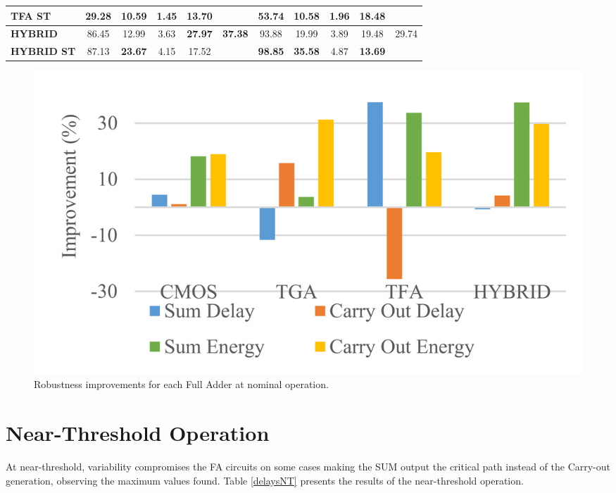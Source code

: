 \documentclass[ecp,tc, english]{iiufrgs}
\begin{document}
\begin{table}[H]
{\begin{tabular}{|l|c|c|c|c|c|c|c|c|c|c|}
\textbf{TFA ST}                   & 29.28          & 10.59          & 1.45          & \textbf{13.70} &                                 & 53.74          & 10.58          & 1.96          & 18.48          &                                 \\ \hline
\textbf{HYBRID}                   & 86.45          & 12.99          & 3.63          & \textbf{27.97} & \multirow{2}{*}{\textbf{37.38}} & 93.88          & 19.99          & 3.89          & 19.48          & \multirow{2}{*}{29.74}          \\ \cline{1-5} \cline{7-10}
\textbf{HYBRID ST}                & 87.13          & \textbf{23.67} & 4.15          & 17.52          &                                 & \textbf{98.85} & \textbf{35.58} & 4.87          & \textbf{13.69} &                                 \\ \hline
\end{tabular}%
}
\end{table}

\begin{figure}[H]
\centering
\includegraphics[width=\textwidth]{Nominalimprov.png}
\caption{Robustness improvements for each Full Adder at nominal operation.}
\label{fig:improvNominal}
\end{figure}

\section{Near-Threshold Operation}

At near-threshold, variability compromises the FA circuits on some cases making the SUM output the critical path instead of the Carry-out generation, observing the maximum values found. Table \ref{delaysNT} presents the results of the near-threshold operation. 
\end{document}
